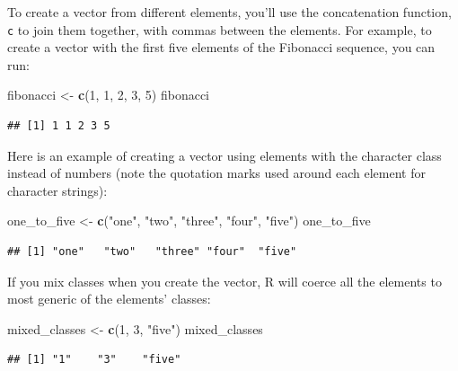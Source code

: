 \documentclass[]{book}
\makeatletter
\newenvironment{Shaded}{\begin{snugshade}}{\end{snugshade}}
\newcommand{\KeywordTok}[1]{\textcolor[rgb]{0.13,0.29,0.53}{\textbf{#1}}}
\newcommand{\DecValTok}[1]{\textcolor[rgb]{0.00,0.00,0.81}{#1}}
\newcommand{\StringTok}[1]{\textcolor[rgb]{0.31,0.60,0.02}{#1}}
\newcommand{\NormalTok}[1]{#1}
\newenvironment{kframe}{%
\medskip{}
\setlength{\fboxsep}{.8em}
 \def\at@end@of@kframe{}%
 \ifinner\ifhmode%
  \def\at@end@of@kframe{\end{minipage}}%
  \begin{minipage}{\columnwidth}%
 \fi\fi%
 \def\FrameCommand##1{\hskip\@totalleftmargin \hskip-\fboxsep
 \colorbox{shadecolor}{##1}\hskip-\fboxsep
     \hskip-\linewidth \hskip-\@totalleftmargin \hskip\columnwidth}%
 \MakeFramed {\advance\hsize-\width
   \@totalleftmargin\z@ \linewidth\hsize
   \@setminipage}}%
 {\par\unskip\endMakeFramed%
 \at@end@of@kframe}
\renewenvironment{Shaded}{\begin{kframe}}{\end{kframe}}
\theoremstyle{definition}
\theoremstyle{definition}
\theoremstyle{definition}
\theoremstyle{remark}
\makeatother
\begin{document}
To create a vector from different elements, you'll use the concatenation
function, \texttt{c} to join them together, with commas between the
elements. For example, to create a vector with the first five elements
of the Fibonacci sequence, you can run:

\begin{Shaded}
\begin{Highlighting}[]
\NormalTok{fibonacci <-}\StringTok{ }\KeywordTok{c}\NormalTok{(}\DecValTok{1}\NormalTok{, }\DecValTok{1}\NormalTok{, }\DecValTok{2}\NormalTok{, }\DecValTok{3}\NormalTok{, }\DecValTok{5}\NormalTok{)}
\NormalTok{fibonacci}
\end{Highlighting}
\end{Shaded}

\begin{verbatim}
## [1] 1 1 2 3 5
\end{verbatim}

Here is an example of creating a vector using elements with the
character class instead of numbers (note the quotation marks used around
each element for character strings):

\begin{Shaded}
\begin{Highlighting}[]
\NormalTok{one_to_five <-}\StringTok{ }\KeywordTok{c}\NormalTok{(}\StringTok{"one"}\NormalTok{, }\StringTok{"two"}\NormalTok{, }\StringTok{"three"}\NormalTok{, }\StringTok{"four"}\NormalTok{, }\StringTok{"five"}\NormalTok{)}
\NormalTok{one_to_five}
\end{Highlighting}
\end{Shaded}

\begin{verbatim}
## [1] "one"   "two"   "three" "four"  "five"
\end{verbatim}

If you mix classes when you create the vector, R will coerce all the
elements to most generic of the elements' classes:

\begin{Shaded}
\begin{Highlighting}[]
\NormalTok{mixed_classes <-}\StringTok{ }\KeywordTok{c}\NormalTok{(}\DecValTok{1}\NormalTok{, }\DecValTok{3}\NormalTok{, }\StringTok{"five"}\NormalTok{)}
\NormalTok{mixed_classes}
\end{Highlighting}
\end{Shaded}

\begin{verbatim}
## [1] "1"    "3"    "five"
\end{verbatim}
\end{document}
